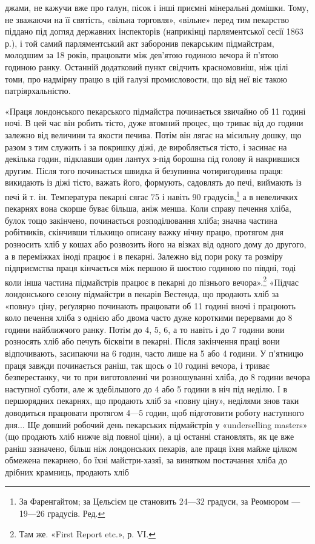 джами, не кажучи вже про галун, пісок і інші приємні мінеральні
домішки. Тому, не зважаючи на її святість, «вільна торговля»,
«вільне» перед тим пекарство піддано під догляд державних
інспекторів (наприкінці парляментської сесії 1863 р.), і той самий
парляментський акт заборонив пекарським підмайстрам, молодшим
за 18 років, працювати між дев’ятою годиною вечора й п’ятою
годиною ранку. Останній додатковий пункт свідчить красномовніш,
ніж цілі томи, про надмірну працю в цій галузі промисловости,
що від неї віє такою патріярхальністю.

«Праця лондонського пекарського підмайстра починається
звичайно об 11 годині ночі. В цей час він робить тісто, дуже втомний
процес, що триває від  до  години залежно від величини
та якости печива. Потім він лягає на місильну дошку, що разом
з тим служить і за покришку діжі, де виробляється тісто, і засинає
на декілька годин, підклавши один лантух з-під борошна під
голову й накрившися другим. Після того починається швидка й
безупинна чотиригодинна праця: викидають із діжі тісто, важать
його, формують, садовлять до печі, виймають із печі й т. ін. Температура
пекарні сягає 75 і навіть 90 градусів,\footnote*{
За Фаренгайтом; за Цельсієм це становить 24—32 градуси, за
Реомюром — 19—26 градусів. Ред.
} а в невеличких пекарнях
вона скорше буває більша, аніж менша. Коли справу печення
хліба, булок тощо закінчено, починається розподілювання хліба;
значна частина робітників, скінчивши тількищо описану важку
нічну працю, протягом дня розносить хліб у кошах або розвозить
його на візках від одного дому до другого, а в переміжках іноді працює
і в пекарні. Залежно від пори року та розміру підприємства
праця кінчається між першою й шостою годиною по півдні, тоді коли
інша частина підмайстрів працює в пекарні до пізнього вечора».\footnote{
Там же. «First Report etc.», р. VI.
}
«Підчас лондонського сезону підмайстри в пекарів Вестенда, що
продають хліб за «повну» ціну, реґулярно починають працювати
об 11 годині вночі і працюють коло печення хліба з однією або
двома часто дуже короткими перервами до 8 години найближчого
ранку. Потім до 4, 5, 6, а то навіть і до 7 години вони розносять
хліб або печуть бісквіти в пекарні. Після закінчення праці вони
відпочивають, засипаючи на 6 годин, часто лише на 5 або 4 години.
У п’ятницю праця завжди починається раніш, так щось о 10 годині
вечора, і триває безперестанку, чи то при виготовленні чи розношуванні
хліба, до 8 години вечора наступної суботи, але ж здебільшого
до 4 або 5 години в ніч під неділю. І в першорядних
пекарнях, що продають хліб за «повну ціну», неділями знов таки
доводиться працювати протягом 4—5 годин, щоб підготовити
роботу наступного дня... Ще довший робочий день пекарських
підмайстрів у «underselling masters» (що продають хліб нижче
від повної ціни), а ці останні становлять, як це вже раніш зазначено,
більш ніж  лондонських пекарів, але праця їхня
майже цілком обмежена пекарнею, бо їхні майстри-хазяї, за
винятком постачання хліба до дрібних крамниць, продають хліб